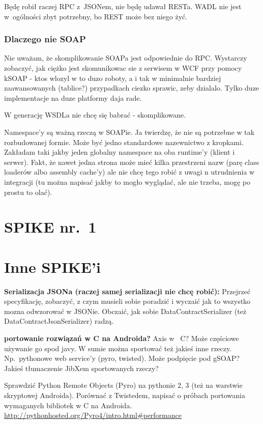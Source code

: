 Będę robił raczej RPC z~JSONem, nie będę udawał RESTa.
WADL nie jest w~ogólności zbyt potrzebny, bo REST może bez niego żyć.

\subsubsection{Dlaczego nie SOAP}
Nie uważam, że skomplikowanie SOAPa jest odpowiednie do RPC\@. Wystarczy zobaczyć, jak ciężko jest skomunikowac sie z serwisem w WCF przy pomocy kSOAP - ktos wlozyl w to duzo roboty, a i tak w minimalnie bardziej zaawansowanych (tablice?) przypadkach ciezko sprawic, zeby dzialalo. Tylko duze implementacje na duze platformy daja rade.

W generację WSDLa nie chcę się babrać - skomplikowane.

Namespace'y są ważną rzeczą w SOAPie. Ja twierdzę, że nie są potrzebne w tak rozbudowanej formie. Może być jedno standardowe nazewnictwo z kropkami. Zakładam taki jakby jeden globalny namespace na oba runtime'y (klient i serwer). Fakt, że nawet jedna strona może mieć kilka przestrzeni nazw (parę class loaderów albo assembly cache'y) ale nie chcę tego robić z uwagi n utrudnienia w integracji (tu można napisać jakby to mogło wyglądać, ale nie trzeba, mogę po prostu to olać).

\section{SPIKE nr.\ 1}



\section{Inne SPIKE'i}

\textbf{Serializacja JSONa (raczej samej serializacji nie chcę robić):}
Przejrzeć specyfikację, zobaczyć, z czym musieli sobie poradzić i wyczaić jak to wszystko mozna odwzorować w JSONie. Obczaić, jak sobie DataContractSerializer (też DataContractJsonSerializer) radzą.

\textbf{portowanie rozwiązań w C na Androida?}
Axis w~ C? Może częściowe używanie go spod javy. W sumie można sportować też jakieś inne rzeczy. Np.\ pythonowe web service'y (pyro, twisted). Może podpięcie pod gSOAP? Jakieś tłumaczenie JibXem sportowanych rzeczy?

Sprawdzić Python Remote Objects (Pyro) na pythonie 2, 3 (też na warstwie skryptowej Androida). Porównać z Twistedem, napisać o próbach portowania wymaganych bibliotek w C na Androida. \url{http://pythonhosted.org/Pyro4/intro.html#performance}

